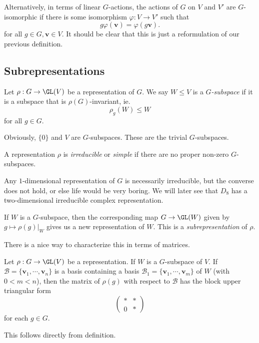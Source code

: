 \documentclass[a4paper]{article}
\begin{document}
Alternatively, in terms of linear $G$-actions, the actions of $G$ on $V$ and $V'$ are $G$-isomorphic if there is some isomorphism $\varphi: V \to V'$ such that
\[
  g \varphi(\mathbf{v}) = \varphi(g\mathbf{v}).
\]
for all $g \in G, \mathbf{v} \in V$. It should be clear that this is just a reformulation of our previous definition.

\subsection{Subrepresentations}
\begin{defi}[$G$-subspace]
  Let $\rho: G \to \GL(V)$ be a representation of $G$. We say $W \leq V$ is a \emph{$G$-subspace} if it is a subspace that is $\rho(G)$-invariant, ie.
  \[
    \rho_g(W) \leq W
  \]
  for all $g \in G$.
\end{defi}

Obviously, $\{0\}$ and $V$ are $G$-subspaces. These are the trivial $G$-subspaces.

\begin{defi}
  A representation $\rho$ is \emph{irreducible} or \emph{simple} if there are no proper non-zero $G$-subspaces.
\end{defi}

\begin{eg}
  Any $1$-dimensional representation of $G$ is necessarily irreducible, but the converse does not hold, or else life would be very boring. We will later see that $D_8$ has a two-dimensional irreducible complex representation.
\end{eg}

\begin{defi}[Subrepresentation]
  If $W$ is a $G$-subspace, then the corresponding map $G \to \GL(W)$ given by $g \mapsto \rho(g)|_W$ gives us a new representation of $W$. This is a \emph{subrepresentation} of $\rho$.
\end{defi}

There is a nice way to characterize this in terms of matrices.
\begin{lemma}
  Let $\rho: G \to \GL(V)$ be a representation. If $W$ is a $G$-subspace of $V$. If $\mathcal{B} = \{\mathbf{v}_1, \cdots, \mathbf{v}_n\}$ is a basis containing a basis $\mathcal{B}_1 = \{\mathbf{v}_1, \cdots, \mathbf{v}_m\}$ of $W$ (with $0 < m < n$), then the matrix of $\rho(g)$ with respect to $\mathcal{B}$ has the block upper triangular form
  \[
    \begin{pmatrix}
      * & *\\
      0 & *
    \end{pmatrix}
  \]
  for each $g \in G$.
\end{lemma}
This follows directly from definition.
\end{document}
